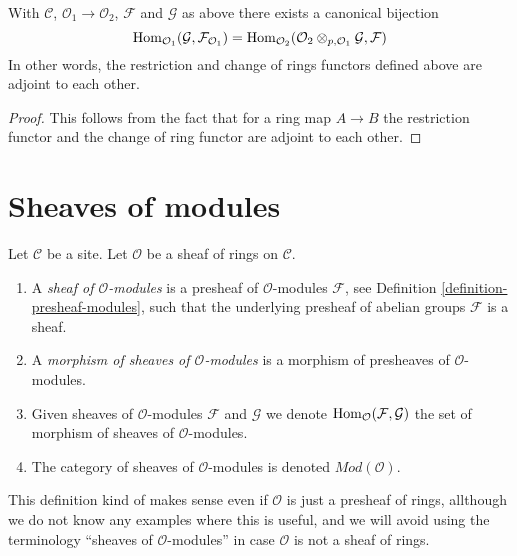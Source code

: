 \begin{lemma}
\label{lemma-adjointness-tensor-restrict-presheaves}
With $\mathcal{C}$, $\mathcal{O}_1 \to \mathcal{O}_2$, $\mathcal{F}$ and
$\mathcal{G}$ as above there exists a canonical bijection
$$
\mathop{\rm Hom}\nolimits_{\mathcal{O}_1}(\mathcal{G}, \mathcal{F}_{\mathcal{O}_1})
=
\mathop{\rm Hom}\nolimits_{\mathcal{O}_2}(
\mathcal{O}_2 \otimes_{p, \mathcal{O}_1} \mathcal{G},
\mathcal{F}
)
$$
In other words, the restriction and change of rings functors defined
above are adjoint to each other.
\end{lemma}

\begin{proof}
This follows from the fact that for a ring map
$A \to B$ the restriction functor and the change
of ring functor are adjoint to each other.
\end{proof}


\section{Sheaves of modules}
\label{section-sheaves-modules}

\begin{definition}
\label{definition-sheaf-modules}
Let $\mathcal{C}$ be a site.
Let $\mathcal{O}$ be a sheaf of rings on $\mathcal{C}$.
\begin{enumerate}
\item A {\it sheaf of $\mathcal{O}$-modules} is a presheaf
of $\mathcal{O}$-modules $\mathcal{F}$,
see Definition \ref{definition-presheaf-modules},
such that the underlying presheaf of abelian groups $\mathcal{F}$
is a sheaf.
\item A {\it morphism of sheaves of $\mathcal{O}$-modules}
is a morphism of presheaves of $\mathcal{O}$-modules.
\item Given sheaves of $\mathcal{O}$-modules
$\mathcal{F}$ and $\mathcal{G}$ we denote
$\mathop{\rm Hom}\nolimits_\mathcal{O}(\mathcal{F}, \mathcal{G})$
the set of morphism of sheaves of $\mathcal{O}$-modules.
\item The category of sheaves of $\mathcal{O}$-modules
is denoted $\textit{Mod}(\mathcal{O})$.
\end{enumerate}
\end{definition}

\noindent
This definition kind of makes sense even if $\mathcal{O}$ is just a
presheaf of rings, allthough we do not know any examples where
this is useful, and we will avoid using the terminology
``sheaves of $\mathcal{O}$-modules''
in case $\mathcal{O}$ is not a sheaf of rings.



